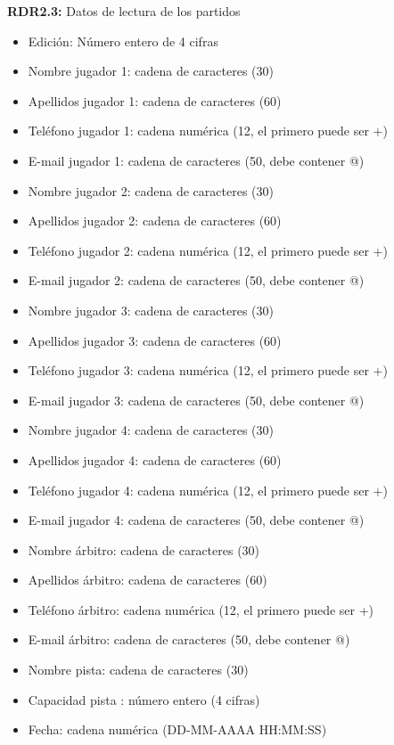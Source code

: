 \textbf{RDR2.3:} Datos de lectura de los partidos
\begin{itemize}
	\item Edición: Número entero de 4 cifras
\newline
	\item Nombre jugador 1: cadena de caracteres (30)
	\item Apellidos jugador 1: cadena de caracteres (60)
	\item Teléfono jugador 1: cadena numérica (12, el primero puede ser +)
	\item E-mail jugador 1: cadena de caracteres (50, debe contener @)
\newline
	\item Nombre jugador 2: cadena de caracteres (30)
	\item Apellidos jugador 2: cadena de caracteres (60)
	\item Teléfono jugador 2: cadena numérica (12, el primero puede ser +)
	\item E-mail jugador 2: cadena de caracteres (50, debe contener @)
\newline
	\item Nombre jugador 3: cadena de caracteres (30)
	\item Apellidos jugador 3: cadena de caracteres (60)
	\item Teléfono jugador 3: cadena numérica (12, el primero puede ser +)
	\item E-mail jugador 3: cadena de caracteres (50, debe contener @)
\newline
	\item Nombre jugador 4: cadena de caracteres (30)
	\item Apellidos jugador 4: cadena de caracteres (60)
	\item Teléfono jugador 4: cadena numérica (12, el primero puede ser +)
	\item E-mail jugador 4: cadena de caracteres (50, debe contener @)
\newline
	\item Nombre árbitro: cadena de caracteres (30)
	\item Apellidos árbitro: cadena de caracteres (60)
	\item Teléfono árbitro: cadena numérica (12, el primero puede ser +)
	\item E-mail árbitro: cadena de caracteres (50, debe contener @)
\newline
	\item Nombre pista: cadena de caracteres (30)
	\item Capacidad pista : número entero (4 cifras)
	\item Fecha: cadena numérica (DD-MM-AAAA HH:MM:SS)
\end{itemize}

